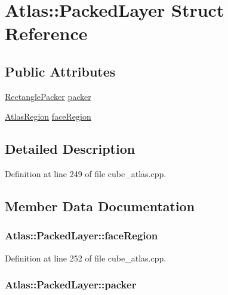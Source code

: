 \hypertarget{struct_atlas_1_1_packed_layer}{\section{Atlas\+:\+:Packed\+Layer Struct Reference}
\label{struct_atlas_1_1_packed_layer}
}
\subsection*{Public Attributes}
\begin{DoxyCompactItemize}
\item 
\hyperlink{class_rectangle_packer}{Rectangle\+Packer} \hyperlink{struct_atlas_1_1_packed_layer_a974839a2ce2e338f6ea84f20bccba03c}{packer}
\item 
\hyperlink{struct_atlas_region}{Atlas\+Region} \hyperlink{struct_atlas_1_1_packed_layer_ae0ba8fd261325ddfc2c99cd5afe1a26d}{face\+Region}
\end{DoxyCompactItemize}


\subsection{Detailed Description}


Definition at line 249 of file cube\+\_\+atlas.\+cpp.



\subsection{Member Data Documentation}
\hypertarget{struct_atlas_1_1_packed_layer_ae0ba8fd261325ddfc2c99cd5afe1a26d}{
\subsubsection[{face\+Region}]{ Atlas\+::\+Packed\+Layer\+::face\+Region}}\label{struct_atlas_1_1_packed_layer_ae0ba8fd261325ddfc2c99cd5afe1a26d}


Definition at line 252 of file cube\+\_\+atlas.\+cpp.

\hypertarget{struct_atlas_1_1_packed_layer_a974839a2ce2e338f6ea84f20bccba03c}{
\subsubsection[{packer}]{ Atlas\+::\+Packed\+Layer\+::packer}}\label{struct_atlas_1_1_packed_layer_a974839a2ce2e338f6ea84f20bccba03c}


